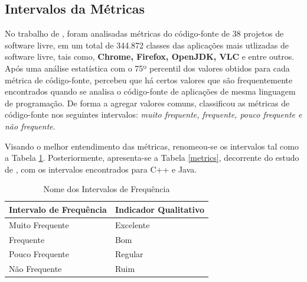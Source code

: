 \subsection{Intervalos da Métricas}
\label{Intervalos das Métricas}

No trabalho de , foram analisadas métricas do código-fonte de 
38 projetos de software livre, em um total de 344.872 classes das aplicações 
mais utlizadas de software livre, tais como, \textbf{Chrome, Firefox, OpenJDK, VLC} e entre outros. Após uma análise estatística com o 75º percentil dos valores obtidos para cada métrica de código-fonte,  percebeu que há certos valores que são frequentemente encontrados quando se 
analisa o código-fonte de aplicações de mesma linguagem de programação. De forma a agregar valores comuns,  classificou as métricas de código-fonte nos seguintes intervalos: \textit{muito frequente, frequente, pouco frequente e não frequente}. 

Visando o melhor entendimento das métricas, renomeou-se os intervalos tal como a Tabela \ref{nomes}. Posteriormente, apresenta-se a Tabela \ref{metrics}, 
decorrente do estudo de , com os intervalos 
encontrados para C++ e Java.

	\begin{table}[!ht]
	\begin{center}
	 \begin{tabular}{|l|l|}
		\hline
		Intervalo de Frequência & Indicador Qualitativo \\ \hline
		Muito Frequente & Excelente \\ \hline
		Frequente       & Bom       \\ \hline
		Pouco Frequente & Regular   \\ \hline
		Não Frequente   & Ruim      \\ \hline
		\end{tabular}
		\caption{Nome dos Intervalos de Frequência}
		\label{nomes}
		\end{center}
		\end{table}
		
\FloatBarrier
	
